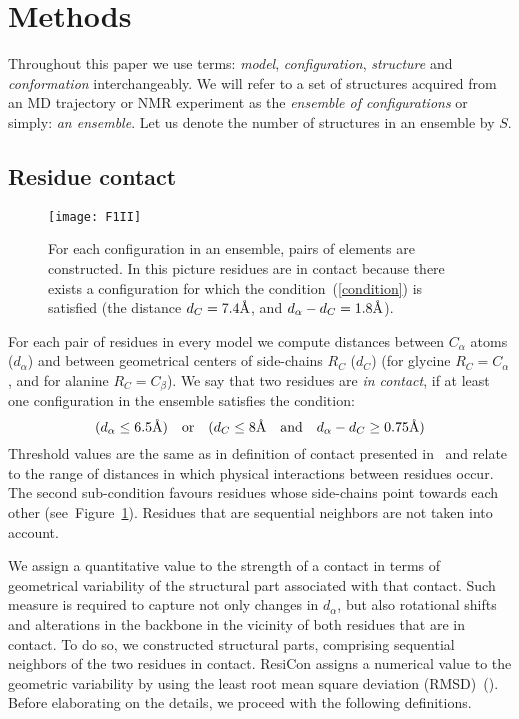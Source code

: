 \documentclass[a4paper,11pt,twoside]{book}%
\begin{document}
\section{Methods}
Throughout this paper we use terms: \emph{model}, \emph{configuration}, \emph{structure} and \emph{conformation} interchangeably.
We will refer to a set of structures acquired from an MD trajectory or NMR experiment as the \emph{ensemble of configurations} or simply: \emph{an ensemble}.
Let us denote the number of structures in an ensemble by $S$.

\subsection*{Residue contact}
\begin{figure}
\centering
\texttt{[image: F1II]}
\caption{
For each configuration in an ensemble, pairs of elements are constructed.
In this picture residues are in contact because there exists a configuration for which the condition~(\ref{condition}) is satisfied (the distance $d_C=7.4\mbox{\normalfont\AA}$, and $d_\alpha-d_C = 1.8\mbox{\normalfont\AA}$).
}
\label{contact}
\end{figure}

For each pair of residues in every model we compute distances between $C_\alpha$ atoms ($d_\alpha$) and between geometrical centers of side-chains $R_C$ ($d_C$) (for glycine $R_C = C_\alpha$, and for alanine $R_C = C_\beta$).
We say that two residues are \emph{in contact}, if at least one configuration in the ensemble satisfies the condition:
\begin{equation}
(d_\alpha \leq 6.5\mbox{\normalfont\AA})\quad \text{or} \quad (d_C \leq 8\mbox{\normalfont\AA}\quad \text{and} \quad d_\alpha - d_C \geq 0.75\mbox{\normalfont\AA})
\label{condition}
\end{equation}
Threshold values are the same as in definition of contact presented in~\cite{daniluk2011novel} and relate to the range of distances in which physical interactions between residues occur.
The second sub-condition favours residues whose side-chains point towards each other (see~Figure~\ref{contact}). 
Residues that are sequential neighbors are not taken into account.

We assign a quantitative value to the strength of a contact in terms of geometrical variability of the structural part associated with that contact.
Such measure is required to capture not only changes in $d_\alpha$, but also rotational shifts and alterations in the backbone in the vicinity of both residues that are in contact.
To do so, we constructed structural parts, comprising sequential neighbors of the two residues in contact.
ResiCon assigns a numerical value to the geometric variability by using the least root mean square deviation (RMSD)~(\cite{kabsch1976solution}).
Before elaborating on the details, we proceed with the following definitions.
\end{document}
